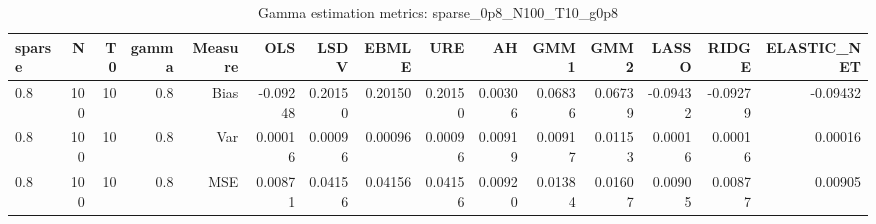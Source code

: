 \begin{table}[!htbp]\centering
\caption{Gamma estimation metrics: sparse_0p8_N100_T10_g0p8}
\label{tab:table1_sparse_0p8_N100_T10_g0p8}
\begin{tabular}{lrrrrrrrrrrrrrr}
\hline
sparse & N & T0 & gamma & Measure & OLS & LSDV & EBMLE & URE & AH & GMM1 & GMM2 & LASSO & RIDGE & ELASTIC_NET \\
\hline
0.8 & 100 & 10 & 0.8 & Bias & -0.09248 & 0.20150 & 0.20150 & 0.20150 & 0.00306 & 0.06836 & 0.06739 & -0.09432 & -0.09279 & -0.09432 \\
0.8 & 100 & 10 & 0.8 & Var & 0.00016 & 0.00096 & 0.00096 & 0.00096 & 0.00919 & 0.00917 & 0.01153 & 0.00016 & 0.00016 & 0.00016 \\
0.8 & 100 & 10 & 0.8 & MSE & 0.00871 & 0.04156 & 0.04156 & 0.04156 & 0.00920 & 0.01384 & 0.01607 & 0.00905 & 0.00877 & 0.00905 \\
\hline
\end{tabular}
\end{table}

